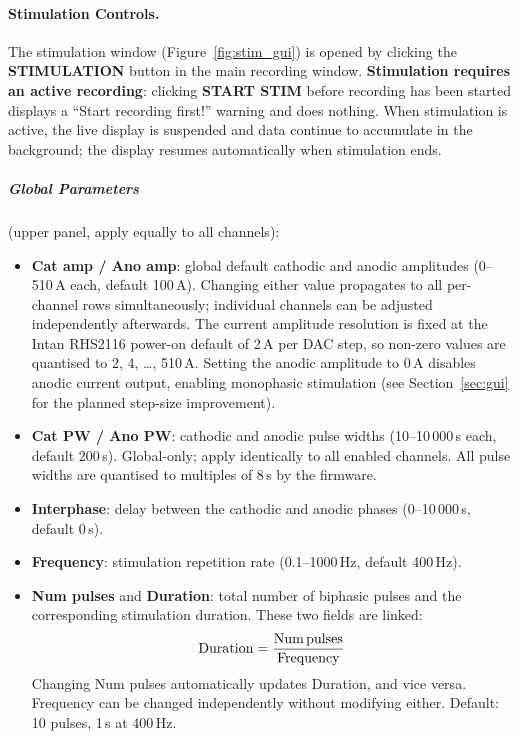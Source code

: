 \begin{itemize}
\end{itemize}

\paragraph{Stimulation Controls.}
The stimulation window (Figure~\ref{fig:stim_gui}) is opened by clicking the
\textbf{STIMULATION} button in the main recording window.
\textbf{Stimulation requires an active recording}: clicking
\textbf{START STIM} before recording has been started displays a
``Start recording first!'' warning and does nothing.
When stimulation is active, the live display is suspended and data
continue to accumulate in the background; the display resumes automatically
when stimulation ends.

\subparagraph{Global Parameters} (upper panel, apply equally to all channels):
\begin{itemize}
    \item \textbf{Cat amp / Ano amp}: global default cathodic and anodic
    amplitudes (0--510\,\textmu{}A each, default 100\,\textmu{}A). Changing
    either value propagates to all per-channel rows simultaneously; individual
    channels can be adjusted independently afterwards. The current amplitude
    resolution is fixed at the Intan RHS2116 power-on default of
    2\,\textmu{}A per DAC step, so non-zero values are quantised to
    2, 4, \ldots, 510\,\textmu{}A. Setting the anodic amplitude to
    0\,\textmu{}A disables anodic current output, enabling monophasic
    stimulation (see Section~\ref{sec:gui} for the planned step-size improvement).

    \item \textbf{Cat PW / Ano PW}: cathodic and anodic pulse widths
    (10--10\,000\,\textmu{}s each, default 200\,\textmu{}s). Global-only;
    apply identically to all enabled channels. All pulse widths are quantised
    to multiples of 8\,\textmu{}s by the firmware.

    \item \textbf{Interphase}: delay between the cathodic and anodic phases
    (0--10\,000\,\textmu{}s, default 0\,\textmu{}s).

    \item \textbf{Frequency}: stimulation repetition rate
    (0.1--1000\,Hz, default 400\,Hz).

    \item \textbf{Num pulses} and \textbf{Duration}: total number of biphasic
    pulses and the corresponding stimulation duration. These two fields are
    linked:
    \begin{equation*}
        \text{Duration} = \frac{\text{Num\,pulses}}{\text{Frequency}}
    \end{equation*}
    Changing Num pulses automatically updates Duration, and vice versa.
    Frequency can be changed independently without modifying either.
    Default: 10 pulses, 1\,s at 400\,Hz.
\end{itemize}


